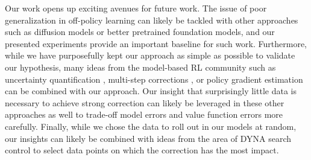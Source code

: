 Our work opens up exciting avenues for future work.
The issue of poor generalization in off-policy learning can likely be tackled with other approaches such as diffusion models \parencite{lu2024synthetic} or better pretrained foundation models, and our presented experiments provide an important baseline for such work.
Furthermore, while we have purposefully kept our approach as simple as possible to validate our hypothesis, many ideas from the model-based RL community such as uncertainty quantification \parencite{pets,talvitie2024bounding}, multi-step corrections \parencite{buckman2018sample,hafner2020dream}, or policy gradient estimation \parencite{amos2021model} can be combined with our approach.
Our insight that surprisingly little data is necessary to achieve strong correction can likely be leveraged in these other approaches as well to trade-off model errors and value function errors more carefully.
Finally, while we chose the data to roll out in our models at random, our insights can likely be combined with ideas from the area of DYNA search control \parencite{pan2019hill,pan2020frequency} to select data points on which the correction has the most impact.
